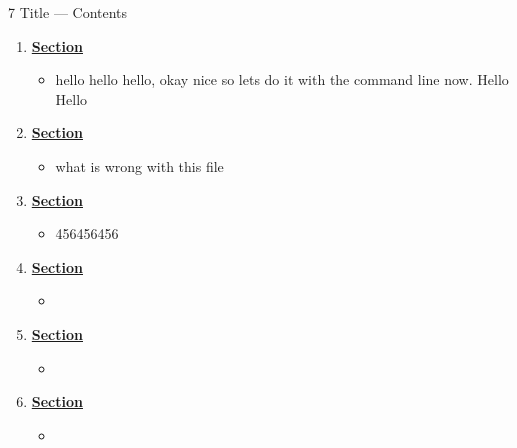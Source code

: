 \documentclass[12pt,letterpaper]{article}
\begin{document}
\setcounter{section}{7} %
\begin{chapbox}{7 Title --- Contents}{ 
\begin{enumerate}[font=\bfseries, wide]
\item \hyperlink{7.1}{\textbf{Section}}
    \begin{itemize}
        \item hello hello hello, okay nice so lets do it with the command line now. Hello Hello
    \end{itemize}
    \item \hyperlink{7.2}{\textbf{Section}}
    \begin{itemize}
        \item what is wrong with this file
    \end{itemize}
\item \hyperlink{7.3}{\textbf{Section}}
    \begin{itemize}
        \item 456456456
    \end{itemize}
\item \hyperlink{7.4}{\textbf{Section}}
    \begin{itemize}
        \item 
    \end{itemize}
\item \hyperlink{7.5}{\textbf{Section}}
    \begin{itemize}
        \item 
    \end{itemize}
\item \hyperlink{7.6}{\textbf{Section}}
    \begin{itemize}
        \item 
    \end{itemize}
\end{enumerate}
}\end{chapbox}
\end{document}
